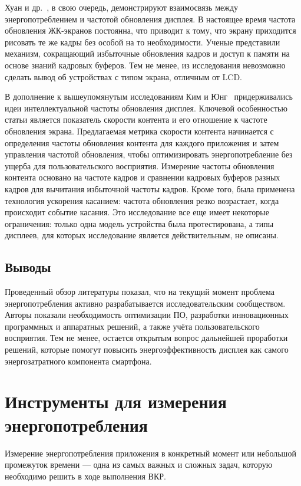 \documentclass[a4paper,14pt]{extarticle} %
\begin{document}
	Хуан и др.~\parencite{huang2014intelligent}, в свою очередь, демонстрируют взаимосвязь между энергопотреблением и частотой обновления дисплея. В настоящее время частота обновления ЖК-экранов постоянна, что приводит к тому, что экрану приходится рисовать те же кадры без особой на то необходимости. Ученые представили механизм, сокращающий избыточные обновления кадров и доступ к памяти на основе знаний кадровых буферов. Тем не менее, из исследования невозможно сделать вывод об устройствах с типом экрана, отличным от LCD.
	
	В дополнение к вышеупомянутым исследованиям Ким и Юнг~\parencite{kim2014content} придерживались идеи интеллектуальной частоты обновления дисплея. Ключевой особенностью статьи является показатель скорости контента и его отношение к частоте обновления экрана. Предлагаемая метрика скорости контента начинается с определения частоты обновления контента для каждого приложения и затем управления частотой обновления, чтобы оптимизировать энергопотребление без ущерба для пользовательского восприятия. Измерение частоты обновления контента основано на частоте кадров и сравнении кадровых буферов разных кадров для вычитания избыточной частоты кадров. Кроме того, была применена технология ускорения касанием: частота обновления резко возрастает, когда происходит событие касания. Это исследование все еще имеет некоторые ограничения: только одна модель устройства была протестирована, а типы дисплеев, для которых исследование является действительным, не описаны.
	
	\subsection{Выводы}
	
	Проведенный обзор литературы показал, что на текущий момент проблема энергопотребления активно разрабатывается исследовательским сообществом. Авторы показали необходимость оптимизации ПО, разработки инновационных программных и аппаратных решений, а также учёта пользовательского восприятия. Тем не менее, остается открытым вопрос дальнейшей проработки решений, которые помогут повысить энергоэффективность дисплея как самого энергозатратного компонента смартфона.
	
	\newpage
	\section{Инструменты для измерения энергопотребления}
	
	Измерение энергопотребления приложения в конкретный момент или небольшой промежуток времени --- одна из самых важных и сложных задач, которую необходимо решить в ходе выполнения ВКР.
	
\end{document}
